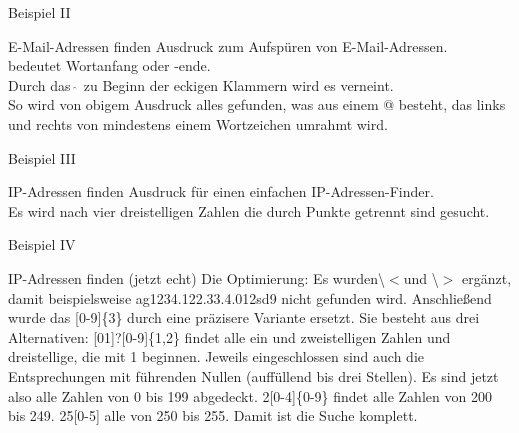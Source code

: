 \documentclass[aspectratio=43]{beamer}
\begin{document}
\begin{frame} 
	\begin{exampleblock}{Beispiel II}
	\end{exampleblock}

	\begin{block}{E­-Mail­-Adressen finden} 
Ausdruck zum Aufspüren von E­-Mail­-Adressen. \\
 bedeutet Wortanfang oder ­-ende. \\
Durch das $\hat{\;}$ zu Beginn der eckigen Klammern wird es verneint. 
\\So wird von obigem Ausdruck alles gefunden, was aus einem @ besteht, das links und rechts von mindestens einem Wortzeichen umrahmt wird. 
	\end{block}	
\end{frame}

\begin{frame} 
	\begin{exampleblock}{Beispiel III}
	\end{exampleblock}

	\begin{block}{IP­-Adressen finden} 
Ausdruck für einen einfachen IP-­Adressen-­Finder.\\
Es wird nach vier dreistelligen Zahlen die durch Punkte getrennt sind gesucht.
	\end{block}	
\end{frame}

\begin{frame} 
	\begin{exampleblock}{Beispiel IV}
	{\fontsize{5.5}{5.5} \selectfont{}}
	\end{exampleblock}

	\begin{block}{IP­-Adressen finden (jetzt echt)} 
Die Optimierung: Es wurden\textbackslash$<$und \textbackslash$>$ ergänzt, damit beispielsweise ag1234.122.33.4.012sd9 nicht gefunden wird. Anschließend wurde das [0­-9]\{3\} durch eine präzisere Variante ersetzt. Sie besteht aus drei Alternativen: [01]?[0-­9]\{1,2\} findet alle ein­ und zweistelligen Zahlen und dreistellige, die mit 1 beginnen. Jeweils eingeschlossen sind auch die Entsprechungen mit führenden Nullen (auffüllend bis drei Stellen). Es sind jetzt also alle Zahlen von 0 bis 199 abgedeckt. 2[0­-4]\{0­-9\} findet alle Zahlen von 200 bis 249. 25[0-­5] alle von 250 bis 255. Damit ist die Suche komplett.
	\end{block}	
\end{frame}
\end{document}
